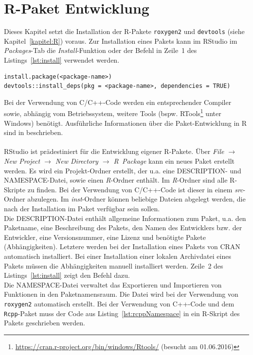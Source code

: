 \section{R-Paket Entwicklung}
\label{kapitel:implementierung_rpaket}
Dieses Kapitel setzt die Installation der R-Pakete \texttt{roxygen2} und \texttt{devtools} (siehe Kapitel~\ref{kapitel:R}) voraus. Zur Installation eines Pakets kann im RStudio im \emph{Packages}-Tab die \emph{Install}-Funktion oder der Befehl in Zeile~1 des Listings~\ref{lst:install} verwendet werden.
\\
\begin{lstlisting}[caption=Installation eines R-Pakets und dessen Abhängigkeiten, label={lst:install}, float=!th]
install.package(<package-name>)
devtools::install_deps(pkg = <package-name>, dependencies = TRUE)
\end{lstlisting}
Bei der Verwendung von C/C++-Code werden ein entsprechender Compiler sowie, abhängig vom Betriebssystem, weitere Tools (bspw. RTools\footnote{\url{https://cran.r-project.org/bin/windows/Rtools/} (besucht am 01.06.2016)} unter Windows) benötigt. Ausführliche Informationen über die Paket-Entwicklung in R sind in \cite{wickham2015r} beschrieben.
\\
\\
RStudio ist prädestiniert für die Entwicklung eigener R-Pakete. Über \emph{File $\rightarrow$ New Project $\rightarrow$ New Directory $\rightarrow$ R~Package} kann ein neues Paket erstellt werden. Es wird ein Projekt-Ordner erstellt, der u.a. eine DESCRIPTION- und NAMESPACE-Datei, sowie einen \emph{R}-Ordner enthält. Im \emph{R}-Ordner sind alle R-Skripte zu finden. Bei der Verwendung von C/C++-Code ist dieser in einem \emph{src}-Ordner abzulegen. Im \emph{inst}-Ordner können beliebige Dateien abgelegt werden, die nach der Installation im Paket verfügbar sein sollen.~\cite[S.~28~ff.]{wickham2015r}
\\
Die DESCRIPTION-Datei enthält allgemeine Informationen zum Paket, u.a. den Paketname, eine Beschreibung des Pakets, den Namen des Entwicklers bzw. der Entwickler, eine Versionsnummer, eine Lizenz und benötigte Pakete (Abhängigkeiten). Letztere werden bei der Installation eines Pakets von CRAN automatisch installiert. Bei einer Installation einer lokalen Archivdatei eines Pakets müssen die Abhängigkeiten manuell installiert werden. Zeile~2 des Listings~\ref{lst:install} zeigt den Befehl dazu.~\cite[S.~67~ff.]{wickham2015r}
\\
Die NAMESPACE-Datei verwaltet das Exportieren und Importieren von Funktionen in den Paketnamensraum. Die Datei wird bei der Verwendung von \texttt{roxygen2} automatisch erstellt. Bei der Verwendung von C++-Code und dem \texttt{Rcpp}-Paket muss der Code aus Listing~\ref{lst:rcppNamespace} in ein R-Skript des Pakets geschrieben werden.~\cite[S.~144~ff.]{wickham2015r}

